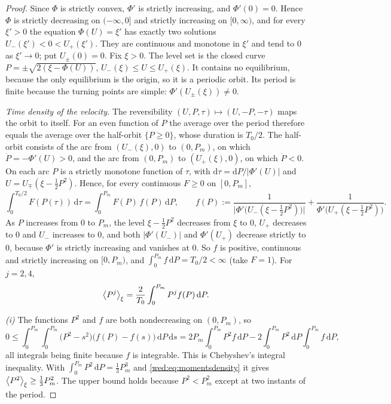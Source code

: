 \begin{proof}
Since $\Phi$ is strictly convex, $\Phi'$ is strictly increasing, and $\Phi'(0)=0$. Hence $\Phi$ is strictly decreasing on $(-\infty,0]$ and strictly increasing on $[0,\infty)$, and for every $\xi'>0$ the equation $\Phi(U)=\xi'$ has exactly two solutions $U_-(\xi')<0<U_+(\xi')$. They are continuous and monotone in $\xi'$ and tend to $0$ as $\xi'\to0$; put $U_\pm(0)=0$. Fix $\xi>0$. The level set is the closed curve $P=\pm\sqrt{2(\xi-\Phi(U))}$, $U_-(\xi)\le U\le U_+(\xi)$. It contains no equilibrium, because the only equilibrium is the origin, so it is a periodic orbit. Its period is finite because the turning points are simple: $\Phi'(U_\pm(\xi))\neq0$.

\emph{Time density of the velocity.} The reversibility $(U,P,\tau)\mapsto(U,-P,-\tau)$ maps the orbit to itself. For an even function of $P$ the average over the period therefore equals the average over the half-orbit $\{P\ge0\}$, whose duration is $T_0/2$. The half-orbit consists of the arc from $(U_-(\xi),0)$ to $(0,P_m)$, on which $\dot P=-\Phi'(U)>0$, and the arc from $(0,P_m)$ to $(U_+(\xi),0)$, on which $\dot P<0$. On each arc $P$ is a strictly monotone function of $\tau$, with $\mathrm d\tau=\mathrm dP/|\Phi'(U)|$ and $U=U_\mp(\xi-\tfrac12P^2)$. Hence, for every continuous $F\ge0$ on $[0,P_m]$,
\begin{equation}\label{wed:eq:density}
\int_0^{T_0/2}F(P(\tau))\,\mathrm d\tau=\int_0^{P_m}F(P)\,f(P)\,\mathrm dP,\qquad
f(P):=\frac1{\bigl|\Phi'\bigl(U_-(\xi-\tfrac12P^2)\bigr)\bigr|}+\frac1{\Phi'\bigl(U_+(\xi-\tfrac12P^2)\bigr)} .
\end{equation}
As $P$ increases from $0$ to $P_m$, the level $\xi-\tfrac12P^2$ decreases from $\xi$ to $0$, $U_+$ decreases to $0$ and $U_-$ increases to $0$, and both $|\Phi'(U_-)|$ and $\Phi'(U_+)$ decrease strictly to $0$, because $\Phi'$ is strictly increasing and vanishes at $0$. So $f$ is positive, continuous and strictly increasing on $[0,P_m)$, and $\int_0^{P_m}f\,\mathrm dP=T_0/2<\infty$ (take $F=1$). For $j=2,4$,
\begin{equation}\label{wed:eq:momentsdensity}
\left\langle P^j\right\rangle_\xi=\frac2{T_0}\int_0^{P_m}P^jf(P)\,\mathrm dP .
\end{equation}

\emph{(i)} The functions $P^2$ and $f$ are both nondecreasing on $(0,P_m)$, so
\[
0\le\int_0^{P_m}\!\!\int_0^{P_m}\bigl(P^2-s^2\bigr)\bigl(f(P)-f(s)\bigr)\,\mathrm dP\,\mathrm ds
=2P_m\int_0^{P_m}P^2f\,\mathrm dP-2\int_0^{P_m}P^2\,\mathrm dP\int_0^{P_m}f\,\mathrm dP ,
\]
all integrals being finite because $f$ is integrable. This is Chebyshev's integral inequality. With $\int_0^{P_m}P^2\,\mathrm dP=\tfrac13P_m^3$ and \eqref{wed:eq:momentsdensity} it gives $\left\langle P^2\right\rangle_\xi\ge\tfrac13P_m^2$. The upper bound holds because $P^2<P_m^2$ except at two instants of the period.


\end{proof}
